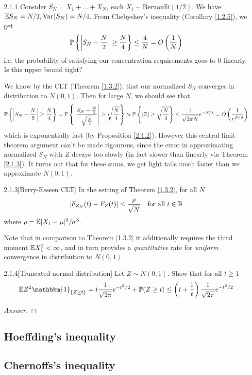 \begin{eg}{2.1.1}
Consider $S_N = X_1 + ... + X_N$, each $X_i \sim \text{Bernoulli}(1/2)$. We have $\mathbb{E} S_N = N/2, \text{Var} (S_N) = N/4$. From Chebyshev's inequality (Corollary \ref{1.2.5}), we get
\begin{align*}
    \mathbb{P} \left\{ \left|S_N - \frac N 2\right| \geq \frac N 4 \right\} \leq \frac 4 N = O\left(\frac1N\right)
\end{align*}
i.e. the probability of satisfying our concentration requirements goes to 0 linearly. Is this upper bound tight?

We know by the CLT (Theorem \ref{1.3.2}), that our normalized $S_N$ converges in distribution to $N(0,1)$. Then for large $N$, we should see that
\begin{align*}
    \mathbb{P} \left\{ \left|S_N - \frac N 2\right| \geq \frac N 4\right\} = \mathbb{P} \left\{\left|\frac {S_N - \frac N 2}{\sqrt{\frac N 4}}\right| \geq \sqrt{\frac N 4} \right\} \approx \mathbb{P} \left\{ |Z| \geq \sqrt{\frac N 4} \right\} \leq \frac 1 {\sqrt{2 \pi N}}e^{-N/8} = \tilde{O}\left(\frac 1 {e^{N/8}}\right)
\end{align*}
which is exponentially fast (by Proposition \ref{2.1.2}). However this central limit theorem argument can't be made rigourous, since the error in approximating normalized $S_N$ with $Z$ decays too slowly (in fact slower than linearly via Theorem \ref{2.1.3}). It turns out that for these sums, we get light tails much faster than we approximate $N(0,1)$.

\end{eg}

\begin{thm}{2.1.3}[Berry-Esseen CLT]\label{2.1.3}
In the setting of Theorem \ref{1.3.2}, for all $N$
\begin{align*}
    |F_{Z_N}(t) - F_Z(t)| \leq  \frac \rho {\sqrt{N}} \quad\text{for all $t\in\mathbb{R}$}
\end{align*}
where $\rho = \mathbb{E} |X_1 - \mu|^3/\sigma^3$.
\end{thm}
Note that in comparison to Theorem \ref{1.3.2} it additionally requires the third moment $\mathbb{E} X_1^3 < \infty$, and in turn provides a \textit{quantitative} rate for \textit{uniform} convergence in distribution to $N(0,1)$.


\begin{ex}{2.1.4}[Truncated normal distribution]
Let $Z \sim N(0,1)$. Show that for all $t\geq 1$
\begin{align*}
    \E Z^2 \mathbbm{1}_{\{Z\geq t\}} = t \frac1{\sqrt{2\pi}}e^{-t^2/2} + \P(Z \geq t) \leq \l(t + \frac1t \r) \frac 1 {\sqrt{2\pi}} e^{-t^2/2}
\end{align*}
\end{ex}

\begin{proof}[Answer]
\end{proof}
\subsection{Hoeffding's inequality}

\subsection{Chernoffs's inequality}

